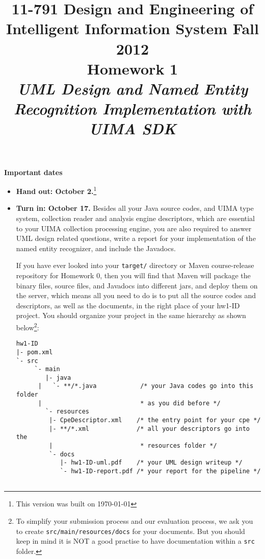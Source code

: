 \documentclass[oneside]{memoir}
\title{{\bfseries 11-791 Design and Engineering of Intelligent Information
System Fall 2012\\Homework 1}\\
\vspace{1em}
\itshape\rmfamily UML Design and Named Entity Recognition Implementation with
UIMA SDK}
\date{}
\begin{document}
\begin{titlingpage}
\maketitle

\hspace{-0.1\textwidth}
\begin{minipage}{1.2\textwidth}
\vspace{-5em}
\textbf{Important dates}
\begin{itemize}

\item \textbf{Hand out: October 2.}\footnote{This version was built on \today}

\item \textbf{Turn in: October 17.} Besides all your Java source codes, and UIMA
type system, collection reader and analysis engine descriptors, which are
essential to your UIMA collection processing engine, you are also required to
answer UML design related questions, write a report for your implementation of
the named entity recognizer, and include the Javadocs.

If you have ever looked into your \verb|target/| directory or Maven
course-release repository for Homework 0, then you will find that Maven will
package the binary files, source files, and Javadocs into different jars, and
deploy them on the server, which means all you need to do is to put all the
source codes and descriptors, as well as the documents, in the right place of
your hw1-ID project. You should organize your project in the same hierarchy as
shown below\footnote{To simplify your submission process and our evaluation
process, we ask you to create \texttt{src/main/resources/docs} for your
documents. But you should keep in mind it is NOT a good practise to have
documentation within a \texttt{src} folder.}:

\small
\begin{verbatim}
hw1-ID
|- pom.xml
`- src
     `- main
        |- java
      |   `- **/*.java            /* your Java codes go into this folder 
      |                           * as you did before */
        `- resources
         |- CpeDescriptor.xml    /* the entry point for your cpe */
         |- **/*.xml             /* all your descriptors go into the 
         |                        * resources folder */
         `- docs
            |- hw1-ID-uml.pdf    /* your UML design writeup */
            `- hw1-ID-report.pdf /* your report for the pipeline */


\end{verbatim}
\end{itemize}
\end{minipage}
\end{titlingpage}
\end{document}
